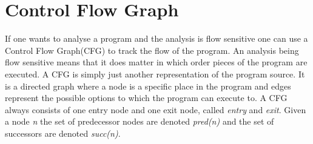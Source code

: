 \section{Control Flow Graph}
If one wants to analyse a program and the analysis is flow sensitive one can use a Control Flow Graph(CFG) to track the flow of the program.
An analysis being flow sensitive means that it does matter in which order pieces of the program are executed.
A CFG is simply just another representation of the program source.
It is a directed graph where a node is a specific place in the program and edges represent the possible options to which the program can execute to.
A CFG always consists of one entry node and one exit node, called \textit{entry} and \textit{exit}.
Given a node \textit{n} the set of predecessor nodes are denoted \textit{pred(n)} and the set of successors are denoted \textit{succ(n)}.
